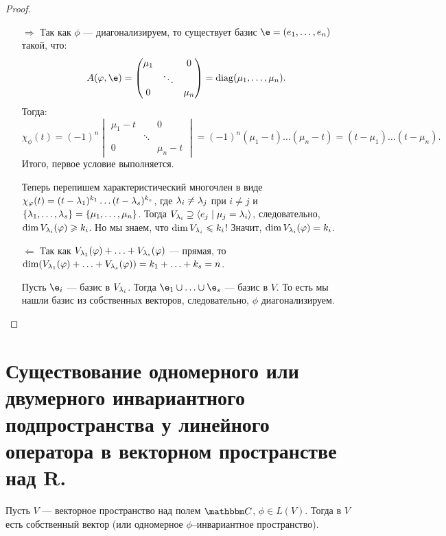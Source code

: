 \begin{proof}\
\begin{itemize}
\item[$\Rightarrow$] Так как $\phi$ --- диагонализируем, то существует базис $\e = (e_1, \ldots, e_n)$ такой, что:
\begin{gather*}
A(\phi, \e) = 
\begin{pmatrix*}
\mu_1 & & 0 \\
& \ddots & \\
0 & & \mu_n
\end{pmatrix*} = \diag(\mu_1, \ldots, \mu_n).
\end{gather*}
Тогда:
$$
\chi_\phi(t) = (-1)^n 
\begin{vmatrix}
\mu_1-t & & 0 \\
& \ddots & \\
0 & & \mu_n-t
\end{vmatrix} = (-1)^n(\mu_1 - t)\ldots(\mu_n - t) = (t - \mu_1)\ldots(t-\mu_n).
$$
Итого, первое условие выполняется.

Теперь перепишем характеристический многочлен в виде $\chi_\varphi(t) = (t - \lambda_1)^{k_1}\dots(t - \lambda_s)^{k_s}$, где $\lambda_i \neq \lambda_j$ при $i \neq j$ и $\{ \lambda_1, \ldots, \lambda_s \} = \{\mu_1, \ldots, \mu_n \}$. Тогда $V_{\lambda_i} \supseteq \langle e_j \mid \mu_j = \lambda_i \rangle$, следовательно, $\dim V_{\lambda_i}(\varphi) \geqslant k_i$. Но мы знаем, что $\dim V_{\lambda_i} \leqslant k_i$! Значит, $\dim V_{\lambda_i}(\varphi) = k_i$.

\item[$\Leftarrow$] Так как $V_{\lambda_1}(\varphi) + \ldots + V_{\lambda_s}(\varphi)$ --- прямая, то $\dim (V_{\lambda_1}(\varphi) + \ldots + V_{\lambda_s}(\varphi)) = k_1 + \ldots + k_s = n$.

Пусть $\e_i$ --- базис в $V_{\lambda_i}$. Тогда $\e_1 \cup \ldots \cup \e_s$ --- базис в $V$. То есть мы нашли базис из собственных векторов, следовательно, $\phi$ диагонализируем.
\end{itemize}
\end{proof}

\section{Существование одномерного или двумерного инвариантного подпространства у линейного оператора в векторном пространстве над R.}

Пусть $V$ --- векторное пространство над полем $\C$, $\phi \in L(V)$. Тогда в $V$ есть собственный вектор (или одномерное $\phi$--инвариантное пространство).


